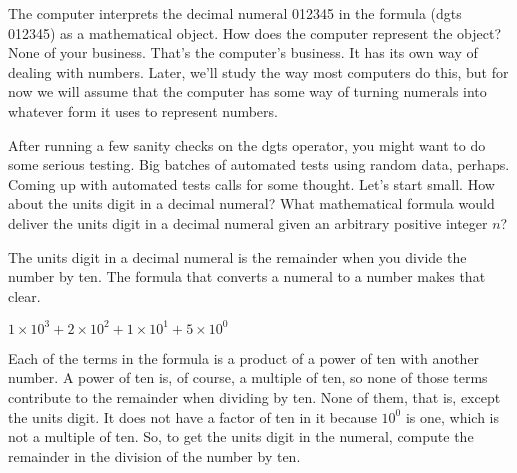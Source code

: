 The computer interprets the
decimal numeral 012345 in the formula \textsf{(dgts 012345)}
as a mathematical object.
How does the computer represent the object? None of your business.
That's the computer's business.
It has its own way of dealing with numbers.
Later, we'll study the way most computers do this,
but for now we will assume that the computer has some way of turning
numerals into whatever form it uses to represent numbers.

After running a few sanity checks on the \textsf{dgts} operator,
you might want to do some serious testing.
Big batches of automated tests using random data, perhaps.
Coming up with automated tests calls for some thought.
Let's start small. How about the units digit in a decimal numeral?
What mathematical formula would deliver the units digit in a
decimal numeral given an arbitrary positive integer $n$?

The units digit in a decimal numeral is the remainder when you divide
the number by ten. The formula that converts a numeral to a number
makes that clear.
\begin{center}
$1 \times 10^3 + 2 \times 10^2 + 1 \times 10^1 + 5 \times 10^0$
\end{center}

Each of the terms in the formula is a product of a power
of ten with another number. A power of ten is, of course,
a multiple of ten, so none of those terms contribute to the remainder
when dividing by ten. None of them, that is, except the units digit.
It does not have a factor of ten in it because
$10^0$ is one, which is not a multiple of ten.
So, to get the units digit in the numeral,
compute the remainder in the division of the number by ten.

